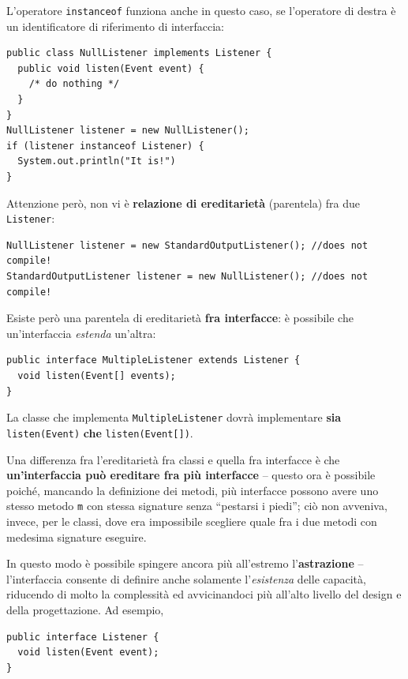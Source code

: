 \documentclass[\fontsizeclass,twocolumn]{\classname}
\theoremstyle{definition}
\theoremstyle{definition}
\begin{document}
L'operatore \texttt{instanceof} funziona anche in questo caso, se l'operatore
di destra è un identificatore di riferimento di interfaccia:

\begin{lstlisting}
public class NullListener implements Listener {
  public void listen(Event event) {
    /* do nothing */
  }
}
NullListener listener = new NullListener();
if (listener instanceof Listener) {
  System.out.println("It is!")
}
\end{lstlisting}

Attenzione però, non vi è \textbf{relazione di ereditarietà} (parentela) fra
due \texttt{Listener}:

\begin{lstlisting}
NullListener listener = new StandardOutputListener(); //does not compile!
StandardOutputListener listener = new NullListener(); //does not compile!
\end{lstlisting}

Esiste però una parentela di ereditarietà \textbf{fra interfacce}: è possibile
che un'interfaccia \emph{estenda} un'altra:

\begin{lstlisting}
public interface MultipleListener extends Listener {
  void listen(Event[] events);
}
\end{lstlisting}

La classe che implementa \texttt{MultipleListener} dovrà implementare
\textbf{sia} \texttt{listen(Event)} \textbf{che} \texttt{listen(Event[])}.

Una differenza fra l'ereditarietà fra classi e quella fra interfacce è che
\textbf{un'interfaccia può ereditare fra più interfacce} -- questo ora è
possibile poiché, mancando la definizione dei metodi, più interfacce possono
avere uno stesso metodo \texttt{m} con stessa signature senza ``pestarsi i
piedi''; ciò non avveniva, invece, per le classi, dove era impossibile
scegliere quale fra i due metodi con medesima signature eseguire.

In questo modo è possibile spingere ancora più all'estremo
l'\textbf{astrazione} -- l'interfaccia consente di definire anche solamente
l'\emph{esistenza} delle capacità, riducendo di molto la complessità ed
avvicinandoci più all'alto livello del design e della progettazione. Ad
esempio,

\begin{lstlisting}
public interface Listener {
  void listen(Event event);
}
\end{lstlisting}
\end{document}
